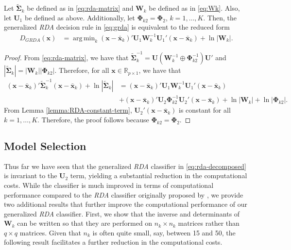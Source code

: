 \documentclass[11pt]{article}
\newcommand{\xbar}{\bar{\bm x}}
\DeclareMathOperator*{\argmin}{arg\,min}
\begin{document}
\begin{thm}
Let $\tilde{\bm \Sigma}_k$ be defined as in \eqref{eq:rda-matrix} and $\bm W_k$ be defined as in \eqref{eq:Wk}. Also, let $\bm U_1$ be defined as above. Additionally, let $\bm \Phi_{k2} = \bm \Phi_2$, $k = 1, \ldots, K$. Then, the generalized \emph{RDA} decision rule in \eqref{eq:grda} is equivalent to the reduced form
	\begin{align}
		D_{GRDA}(\bm x) &= \argmin_k  (\bm x - \xbar_k)' \bm U_1 \bm W_k^{-1} \bm U_1' (\bm x - \xbar_k) + \ln | \bm W_k |. \label{eq:rda-decomposed}
	\end{align}
	
\end{thm}
\begin{proof}
	From \eqref{eq:rda-matrix}, we have that $\tilde{\bm \Sigma}_k^{-1} = \bm U(\bm W_k^{-1} \oplus\bm \Phi_{k2}^{-1})\bm U'$ and $|\tilde{\bm \Sigma}_k| = | \bm W_k | |\bm \Phi_{k2}|$. Therefore, for all $\bm x \in \mathbb{R}_{p \times 1}$, we have that
	\begin{align*}
	(\bm x - \xbar_k)' \tilde{\bm\Sigma}_k^{-1}(\bm x - \xbar_k)  + \ln |\tilde{\bm\Sigma}_k| &= (\bm x - \xbar_k)' \bm U_1 \bm W_k^{-1} \bm U_1' (\bm x - \xbar_k)\\
	&+ (\bm x - \xbar_k)' \bm U_2 \bm \Phi_{k2}^{-1} \bm U_2' (\bm x - \xbar_k) + \ln | \bm W_k | + \ln |\bm \Phi_{k2}|.
	\end{align*}
From Lemma \ref{lemma:RDA-constant-term}, $\bm U_2' (\bm x - \xbar_k)$ is constant for all $k = 1, \ldots, K$. Therefore, the proof follows because $\bm \Phi_{k2} = \bm \Phi_2$.
\end{proof}

\subsection{Model Selection}

Thus far we have seen that the generalized \emph{RDA} classifier in \eqref{eq:rda-decomposed} is invariant to the $\bm U_2$ term, yielding a substantial reduction in the computational costs. While the classifier is much improved in terms of computational performance compared to the \emph{RDA} classifier originally proposed by \cite{Friedman:1989tm}, we provide two additional results that further improve the computational performance of our generalized \emph{RDA} classifier. First, we show that the inverse and determinants of $\bm W_k$ can be written so that they are performed on $n_k \times n_k$ matrices rather than $q \times q$ matrices. Given that $n_k$ is often quite small, say, between 15 and 50, the following result facilitates a further reduction in the computational costs.
\end{document}
